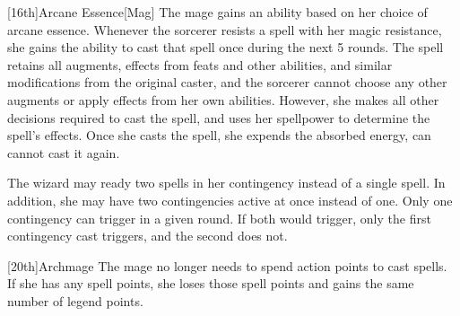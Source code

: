         [16th]{Arcane Essence}[Mag]
        The mage gains an ability based on her choice of arcane essence.
         Whenever the sorcerer resists a spell with her magic resistance, she gains the ability to cast that spell once during the next 5 rounds.
        The spell retains all augments, effects from feats and other abilities, and similar modifications from the original caster, and the sorcerer cannot choose any other augments or apply effects from her own abilities.
        However, she makes all other decisions required to cast the spell, and uses her spellpower to determine the spell's effects.
        Once she casts the spell, she expends the absorbed energy, can cannot cast it again.

         The wizard may ready two spells in her contingency instead of a single spell.
        In addition, she may have two contingencies active at once instead of one.
        Only one contingency can trigger in a given round.
        If both would trigger, only the first contingency cast triggers, and the second does not.

        [20th]{Archmage}
        The mage no longer needs to spend action points to cast spells.
        If she has any spell points, she loses those spell points and gains the same number of legend points.

